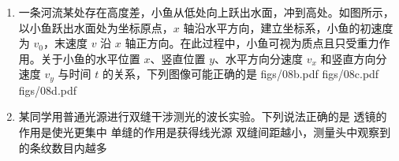 \documentclass[\gkver]{gaokaozhenti}
\begin{document}
\begin{enumerate}
{根据电流的定义式得 $I = \frac{q}{t} = nevb$

当电子稳定通过样品时，其所受电场力与洛伦兹力平衡，则有
$evB = e\frac{U}{b}$

联立解得 $U = \frac{I}{ne}B$

结合图像可得 $k = \frac{I}{ne} = \frac{88\times10^{-3}}{320\times10^{-3}} \UV/\UT$

解得 $n = 2.3 \times 10^{16}$

故选 D。
}

\item
一条河流某处存在高度差，小鱼从低处向上跃出水面，冲到高处。如图所示，以小鱼跃出水面处为坐标原点，$x$ 轴沿水平方向，建立坐标系，小鱼的初速度为 $v_{0}$，末速度 $v$ 沿 $x$ 轴正方向。在此过程中，小鱼可视为质点且只受重力作用。关于小鱼的水平位置 $x$、竖直位置 $y$、水平方向分速度 $v_{x}$ 和竖直方向分速度 $v_{y}$ 与时间 $t$ 的关系，下列图像可能正确的是
{figs/08b.pdf}
{figs/08c.pdf}
{figs/08d.pdf}

\item
某同学用普通光源进行双缝干涉测光的波长实验。下列说法正确的是
{透镜的作用是使光更集中}
{单缝的作用是获得线光源}
{双缝间距越小，测量头中观察到的条纹数目内越多}
\end{enumerate}
\end{document}
